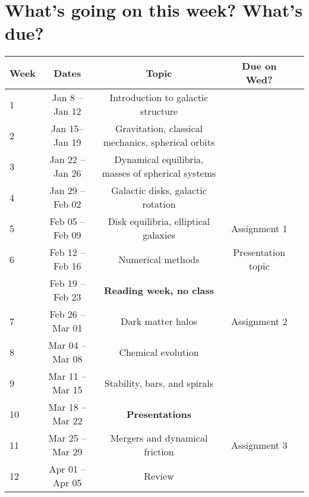 \documentclass{article}
\begin{document}
\section*{What's going on this week? What's due?}

\begin{table}[H]
\begin{center}
\begin{tabular}{lcccc}
Week & Dates &  \quad Topic & \quad Due on Wed? & \\
\hline
\hline
1 & Jan 8 -- Jan 12 & Introduction to galactic structure & \\
2 & Jan 15-- Jan 19 & Gravitation, classical mechanics, spherical orbits &  \\ 
3 & Jan 22 -- Jan 26 & Dynamical equilibria, masses of spherical systems &  \\
4 & Jan 29 -- Feb 02 & Galactic disks, galactic rotation &  \\
5 & Feb 05 -- Feb 09 & Disk equilibria, elliptical galaxies &  Assignment 1 \\
6 & Feb 12 -- Feb 16 & Numerical methods & Presentation topic  \\ 
 & Feb 19 -- Feb 23  & {\bf Reading week, no class}&  \\
7 & Feb 26 -- Mar 01 & Dark matter halos & Assignment 2  \\
8 & Mar 04 -- Mar 08 & Chemical evolution &  \\
9 & Mar 11 -- Mar 15 & Stability, bars, and spirals & \\
10 & Mar 18 -- Mar 22 & {\bf Presentations}&  \\ 
11 & Mar 25 -- Mar 29 & Mergers and dynamical friction & Assignment 3 \\
12 & Apr 01 -- Apr 05 & Review &   
\end{tabular}
\end{center}
\end{table}
\end{document}
